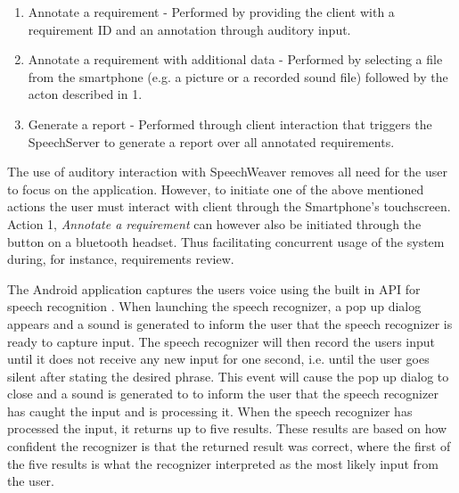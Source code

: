 \documentclass[conference]{IEEEtran}
\begin{document}
\begin{enumerate}
    \item Annotate a requirement - Performed by providing the client with a requirement ID and an annotation through auditory input.
	\item Annotate a requirement with additional data - Performed by selecting a file from the smartphone (e.g. a picture or a recorded sound file) followed by the acton described in 1. 
	\item Generate a report - Performed through client interaction that triggers the SpeechServer to generate a report over all annotated requirements.
\end{enumerate}

The use of auditory interaction with SpeechWeaver removes all need for the user to focus on the application.
However, to initiate one of the above mentioned actions the user must interact with client through the Smartphone's touchscreen.
Action 1, \emph{Annotate a requirement} can however also be initiated through the button on a bluetooth headset.
Thus facilitating concurrent usage of the system during, for instance, requirements review.


The Android application captures the users voice using the built in API for speech recognition \cite{recAPI}.
When launching the speech recognizer, a pop up dialog appears and a sound is generated to inform the user that the speech recognizer is ready to capture input.
The speech recognizer will then record the users input until it does not receive any new input for one second, i.e. until the user goes silent after stating the desired phrase. 
This event will cause the pop up dialog to close and a sound is generated to to inform the user that the speech recognizer has caught the input and is processing it. 
When the speech recognizer has processed the input, it returns up to five results. 
These results are based on how confident the recognizer is that the returned result was correct, where the first of the five results is what the recognizer interpreted as the most likely input from the user.
\end{document}
